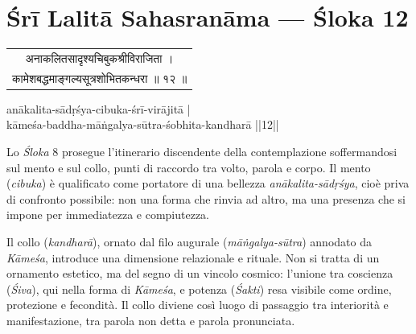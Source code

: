 \chapter*{Śrī Lalitā Sahasranāma — Śloka 12}

\begin{sloka}
{\sanskritfont
\begin{tabular}{c}
अनाकलितसादृश्यचिबुकश्रीविराजिता ।\\
कामेशबद्धमाङ्गल्यसूत्रशोभितकन्धरा ॥ १२ ॥
\end{tabular}

\vspace{1.5em}

{\middlesize \iastfont
anākalita-sādṛśya-cibuka-śrī-virājitā |\\
kāmeśa-baddha-māṅgalya-sūtra-śobhita-kandharā ||12||}

\vspace{1em}

{\middlesize
{}
}

\middlesize \iastfont {}

}
\end{sloka}


Lo \textit{Śloka} 8 prosegue l’itinerario discendente della contemplazione soffermandosi sul mento e sul collo, punti di raccordo tra volto, parola e corpo. Il mento (\textit{cibuka}) è qualificato come portatore di una bellezza \textit{anākalita-sādṛśya}, cioè priva di confronto possibile: non una forma che rinvia ad altro, ma una presenza che si impone per immediatezza e compiutezza.

Il collo (\textit{kandharā}), ornato dal filo augurale (\textit{māṅgalya-sūtra}) annodato da \textit{Kāmeśa}, introduce una dimensione relazionale e rituale. Non si tratta di un ornamento estetico, ma del segno di un vincolo cosmico: l’unione tra coscienza (\textit{Śiva}), qui nella forma di \textit{Kāmeśa}, e potenza (\textit{Śakti}) resa visibile come ordine, protezione e fecondità. Il collo diviene così luogo di passaggio tra interiorità e manifestazione, tra parola non detta e parola pronunciata.

